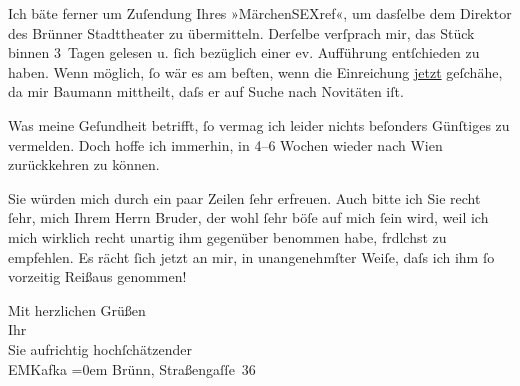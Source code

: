 \pstart
           Ich bäte ferner um Zuſendung Ihres »MärchenSEXref«, um
               dasſelbe dem Direktor des
               Brünner Stadttheater zu übermit{\pb}teln. Derſelbe verſprach mir, das Stück binnen 3 Tagen
               gelesen u.{ }ſich bezüglich einer ev. Aufführung entſchieden zu haben. Wenn möglich,{ }ſo
               wär es am beſten, wenn die Einreichung \uline{jetzt}
               geſchähe, da mir Baumann mittheilt, daſs er
               auf Suche \introOben{}nach Novitäten\introOben{} iſt.\pend
           
\pstart
           Was meine Geſundheit betrifft,{ }ſo vermag ich leider nichts beſonders Günſtiges zu
               vermelden. Doch hoffe ich immerhin, in 4–6 Wochen wieder nach Wien zurückkehren zu können.\pend
           
\pstart
           Sie würden mich durch ein paar Zeilen{ }ſehr erfreuen. Auch bitte ich Sie recht{ }ſehr,
               mich Ihrem Herrn Bruder, der
               wohl{ }ſehr böſe auf mich{ }ſein wird, weil ich mich wirklich recht unartig ihm gegenüber
               benommen habe, frdlchst zu empfehlen. Es rächt{ }ſich jetzt an mir, in unangenehmſter
               Weiſe, daſs ich ihm{ }ſo vorzeitig Reißaus genommen!\pend
           
\pstart
           Mit herzlichen Grüßen{\\[\baselineskip]}Ihr{\\[\baselineskip]}Sie aufrichtig hochſchätzender{\\[\baselineskip]}\spacefill\mbox{EMKafka}\pend
           \leftskip=0em{}
\pstart
           \noindent{}Brünn, Straßengaſſe 36\pend
           
